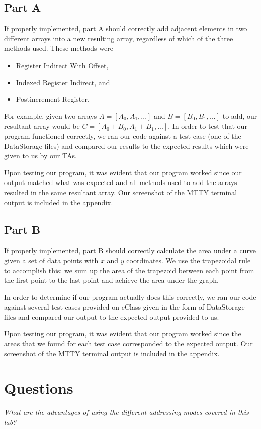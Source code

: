 \documentclass[10pt, letterpaper, titlepage]{article} %
\begin{document}
\begin{multicols*}{2}
\subsection{Part A}
If properly implemented, part A should correctly add adjacent elements in two different arrays into a new resulting array, regardless of which of the three methods used. 
These methods were
\begin{itemize}
	\item Register Indirect With Offset,
	\item Indexed Register Indirect, and
	\item Postincrement Register.
\end{itemize}
For example, given two arrays $A = [A_0, A_1, ...]$ and $B = [B_0, B_1, ...]$ to add, our resultant array would be $C = [A_0 + B_0, A_1 + B_1, ...]$.
In order to test that our program functioned correctly, we ran our code against a test case (one of the DataStorage files) and compared our results to the expected results which were given to us by our TAs. 

Upon testing our program, it was evident that our program worked since our output matched what was expected and all methods used to add the arrays resulted in the same resultant array. Our screenshot of the MTTY terminal output is included in the appendix.

\subsection{Part B}
If properly implemented, part B should correctly calculate the area under a curve given a set of data points with $x$ and $y$ coordinates. We use the trapezoidal rule to accomplish this: we sum up the area of the trapezoid between each point from the first point to the last point and achieve the area under the graph. 

In order to determine if our program actually does this correctly, we ran our code against several test cases provided on eClass given in the form of DataStorage files and compared our output to the expected output provided to us. 

Upon testing our program, it was evident that our program worked since the areas that we found for each test case corresponded to the expected output. Our screenshot of the MTTY terminal output is included in the appendix.

\section{Questions}
\textit{What are the advantages of using the different addressing modes covered in this lab?}


\end{multicols*}
\end{document}
